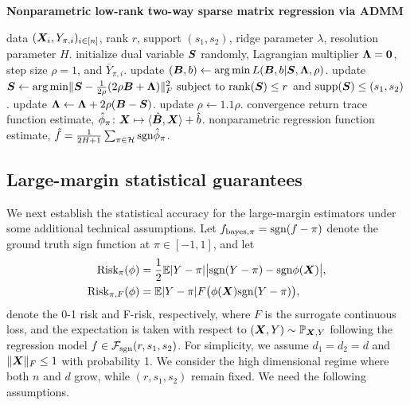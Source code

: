 \documentclass[11pt]{article}
\theoremstyle{plain}
\theoremstyle{definition}
\def\caliF{\tF_{\textup{sgn}}}
\def\sign{\textup{sgn}}
\def\bayespif{f_{\textup{bayes},\pi}}
\def\rank{\textup{rank}}
\def\risk{\textup{Risk}_\pi}
\def\caliF{\tF_{\textup{sgn}}}
\def\riskF{\textup{Risk}_{\pi,F}}
\begin{document}
\begin{algorithm}[t!]
\caption{{\bf Nonparametric low-rank two-way sparse matrix regression via ADMM} } \label{alg:weighted}
\begin{algorithmic}[1] 
\INPUT data $(\bm X_i,Y_{\pi, i})_{i\in[n]}$, rank $r$, support $(s_1,s_2)$, ridge parameter $\lambda$, resolution parameter $H$.
\State initialize dual variable $\bm S$ randomly, Lagrangian multiplier $\bm{\Lambda}=\mathbf{0}$, step size $\rho=1$, and $\bar Y_{\pi, i}$.
\Repeat
\State update $(\bm B,b) \leftarrow \operatorname*{arg\,min} L(\bm B, b|\bm S,\bm{\Lambda},\rho)$.
\State update $\mS \leftarrow  \argmin \FnormSize{}{\mS-{1\over 2\rho}(2\rho\mB+\mLambda)}^2 \ \text{subject to }\rank(\mS)\leq r$ and $\text{supp}(\bm S)\leq (s_1,s_2)$.
\State update $\bm{\Lambda} \leftarrow \bm{\Lambda}+2\rho(\bm B-\bm S)$.
\State update $\rho\leftarrow1.1\rho$.
\Until convergence
\State return trace function estimate, $\hat \phi_\pi\colon \bm X\mapsto \langle \hat {\bm B}, \bm X \rangle+\hat b$.
\EndFor
\OUTPUT nonparametric regression function estimate, $\hat f= {1\over 2H+1}\sum_{\pi \in \tH}\sign \hat \phi_\pi$.
\end{algorithmic}
\end{algorithm}



\subsection{Large-margin statistical guarantees}\label{sec:large-margin}

We next establish the statistical accuracy for the large-margin estimators under some additional technical assumptions. Let $\bayespif=\sign(f-\pi)$ denote the ground truth sign function at $\pi\in[-1,1]$, and let
\begin{align} \label{eq:riskdef}
\begin{split}
\risk(\phi) & =  {1\over 2}\mathbb{E}|Y-\pi| \big|\sign(Y-\pi)-\sign \phi(\mX)\big|, \\
\riskF(\phi) & =  \mathbb{E}|Y-\pi|F\big(\phi(\mX)\sign(Y-\pi)\big), 
\end{split}
\end{align}
denote the 0-1 risk and F-risk, respectively, where $F$ is the surrogate continuous loss, and the expectation is taken with respect to $(\bm X,Y)\sim \mathbb{P}_{\bm X,Y}$ following the regression model $f\in\caliF(r,s_1,s_2)$. For simplicity, we assume $d_1 = d_2 = d$ and $\lVert\bm X\rVert_F\leq 1$ with probability 1. We consider the high dimensional regime where both $n$ and $d$ grow, while $(r,s_1,s_2)$ remain fixed. We need the following assumptions. 
 
\end{document}
